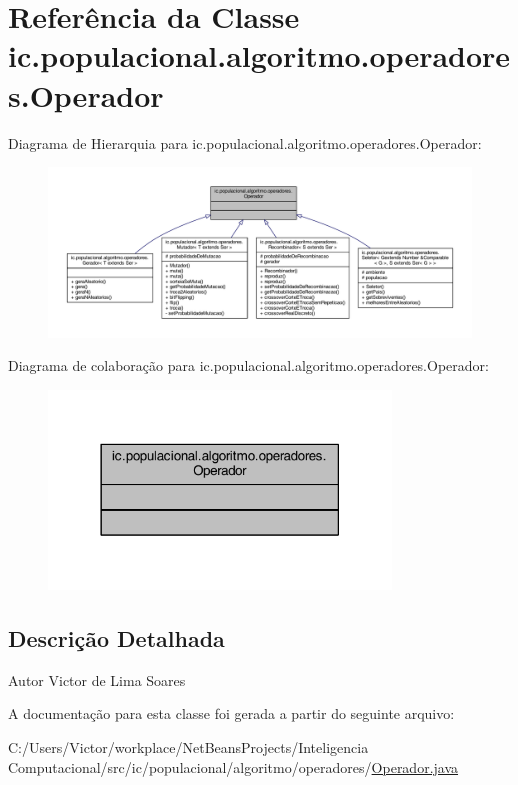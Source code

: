 \hypertarget{classic_1_1populacional_1_1algoritmo_1_1operadores_1_1_operador}{\section{Referência da Classe ic.\-populacional.\-algoritmo.\-operadores.\-Operador}
\label{classic_1_1populacional_1_1algoritmo_1_1operadores_1_1_operador}
}


Diagrama de Hierarquia para ic.\-populacional.\-algoritmo.\-operadores.\-Operador\-:
\nopagebreak
\begin{figure}[H]
\begin{center}
\leavevmode
\includegraphics[width=350pt]{classic_1_1populacional_1_1algoritmo_1_1operadores_1_1_operador__inherit__graph}
\end{center}
\end{figure}


Diagrama de colaboração para ic.\-populacional.\-algoritmo.\-operadores.\-Operador\-:\nopagebreak
\begin{figure}[H]
\begin{center}
\leavevmode
\includegraphics[width=258pt]{classic_1_1populacional_1_1algoritmo_1_1operadores_1_1_operador__coll__graph}
\end{center}
\end{figure}


\subsection{Descrição Detalhada}
\begin{DoxyAuthor}{Autor}
Victor de Lima Soares 
\end{DoxyAuthor}


A documentação para esta classe foi gerada a partir do seguinte arquivo\-:\begin{DoxyCompactItemize}
\item 
C\-:/\-Users/\-Victor/workplace/\-Net\-Beans\-Projects/\-Inteligencia Computacional/src/ic/populacional/algoritmo/operadores/\hyperlink{_operador_8java}{Operador.\-java}\end{DoxyCompactItemize}
